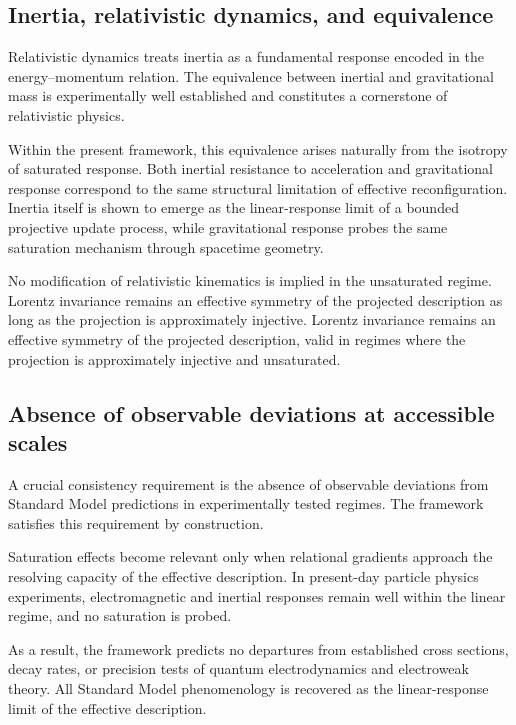 \documentclass[pdflatex,sn-mathphys-num]{sn-jnl} %
\theoremstyle{remark}
\begin{document}
    \subsection{Inertia, relativistic dynamics, and equivalence}
      \label{subsec:inertia-consistency}

      Relativistic dynamics treats inertia as a fundamental response encoded in the
      energy--momentum relation.
      The equivalence between inertial and gravitational mass is experimentally
      well established and constitutes a cornerstone of relativistic physics.

      Within the present framework, this equivalence arises naturally from the
      isotropy of saturated response.
      Both inertial resistance to acceleration and gravitational response correspond
      to the same structural limitation of effective reconfiguration.
      Inertia itself is shown to emerge as the linear-response limit of a bounded
      projective update process, while gravitational response probes the same
      saturation mechanism through spacetime geometry.

      No modification of relativistic kinematics is implied in the unsaturated regime.
      Lorentz invariance remains an effective symmetry of the projected description
      as long as the projection is approximately injective.
      Lorentz invariance remains an effective symmetry of the projected
      description, valid in regimes where the projection is approximately injective
      and unsaturated.

    \subsection{Absence of observable deviations at accessible scales}
      \label{subsec:absence}

      A crucial consistency requirement is the absence of observable deviations
      from Standard Model predictions in experimentally tested regimes.
      The framework satisfies this requirement by construction.

      Saturation effects become relevant only when relational gradients approach the
      resolving capacity of the effective description.
      In present-day particle physics experiments, electromagnetic and inertial
      responses remain well within the linear regime, and no saturation is probed.

      As a result, the framework predicts no departures from established cross
      sections, decay rates, or precision tests of quantum electrodynamics and
      electroweak theory.
      All Standard Model phenomenology is recovered as the linear-response limit of
      the effective description.
\end{document}
